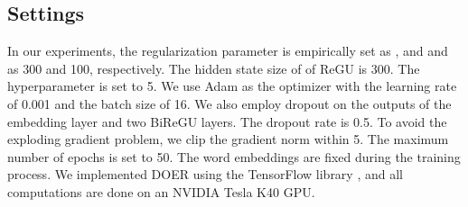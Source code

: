 \documentclass[11pt,a4paper]{article}
\begin{document}
	\subsection{Settings}
	In our experiments, the regularization parameter  is empirically set as , and  and  as 300 and 100, respectively. The hidden state size of  of ReGU is 300. The hyperparameter  is set to 5. We use Adam \cite{Kingma2015} as the optimizer with the learning rate of 0.001 and the batch size of 16. We also employ dropout \cite{Srivastava2014} on the outputs of the embedding layer and two BiReGU layers. The dropout rate is 0.5. To avoid the exploding gradient problem, we clip the gradient norm within 5. The maximum number of epochs is set to 50. The word embeddings are fixed during the training process. We implemented DOER using the TensorFlow library \cite{Abadi2016a}, and all computations are done on an NVIDIA Tesla K40 GPU.
\end{document}
